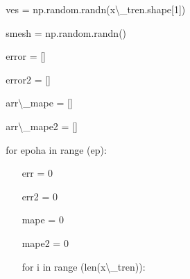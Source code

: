 \documentclass{article}%
\begin{document}
\begin{enumerate}
\begin{flushleft}
    ves = np.random.randn(x\textbackslash{}_tren.shape[1])%
%
\end{flushleft}%
\begin{flushleft}%
    smesh = np.random.randn()%
%
\end{flushleft}%
\begin{flushleft}%
    error = []%
%
\end{flushleft}%
\begin{flushleft}%
    error2 = []%
%
\end{flushleft}%
\begin{flushleft}%
    arr\textbackslash{}_mape = []%
%
\end{flushleft}%
\begin{flushleft}%
    arr\textbackslash{}_mape2 = []%
%
\end{flushleft}%
\begin{flushleft}%
    for epoha in range (ep):%
%
\end{flushleft}%
\begin{flushleft}%
        err = 0%
%
\end{flushleft}%
\begin{flushleft}%
        err2 = 0%
%
\end{flushleft}%
\begin{flushleft}%
        mape = 0%
%
\end{flushleft}%
\begin{flushleft}%
        mape2 = 0%
%
\end{flushleft}%
\begin{flushleft}%
        for i in range (len(x\textbackslash{}_tren)):%

\end{flushleft}
\end{enumerate}
\end{document}
